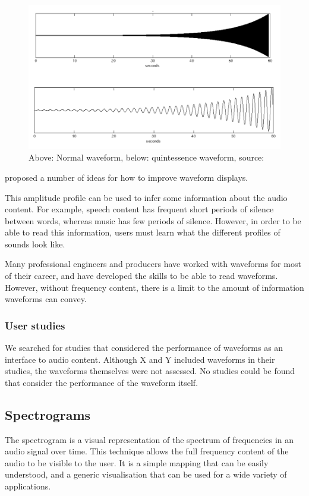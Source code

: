 \begin{figure}[p]
  \centering
  \includegraphics[width=0.95\linewidth]{figs/quint.png}
  \caption{Above: Normal waveform, below: quintessence waveform, source: \citep{Loviscach2011}}
  \label{fig:quint}
\end{figure}

\citet{Gohlke2010} proposed a number of ideas for how to improve waveform displays.

This amplitude profile can be used to infer some information about the audio content. For example, speech content has
frequent short periods of silence between words, whereas music has few periods of silence. However, in order to be able
to read this information, users must learn what the different profiles of sounds look like.

Many professional engineers and producers have worked with waveforms for most of their career, and have developed the
skills to be able to read waveforms.  However, without frequency content, there is a limit to the amount of information
waveforms can convey.

\subsubsection{User studies}

We searched for studies that considered the performance of waveforms as an interface to audio content. Although X and Y
included waveforms in their studies, the waveforms themselves were not assessed. No studies could be found that
consider the performance of the waveform itself.

\subsection{Spectrograms}
The spectrogram is a visual representation of the spectrum of frequencies in an audio signal over time.  This technique
allows the full frequency content of the audio to be visible to the user. It is a simple mapping that can be easily
understood, and a generic visualisation that can be used for a wide variety of applications.

